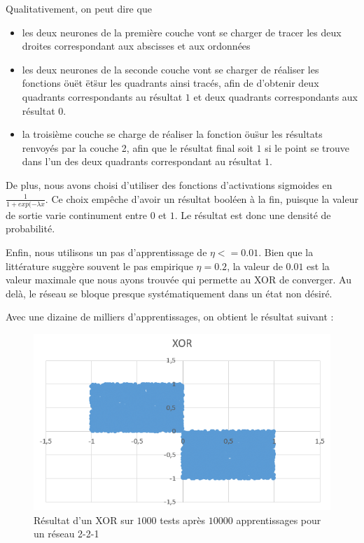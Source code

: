 Qualitativement, on peut dire que 
\begin{itemize}
  \item les deux neurones de la première couche vont se charger de tracer les deux droites correspondant aux abscisses et aux ordonnées
  \item les deux neurones de la seconde couche vont se charger de réaliser les fonctions \"ou\" et \"et\" sur les quadrants ainsi tracés, afin de d'obtenir deux quadrants correspondants au résultat $1$ et deux quadrants correspondants aux résultat $0$.
  \item la troisième couche se charge de réaliser la fonction \"ou\" sur les résultats renvoyés par la couche 2, afin que le résultat final soit $1$ si le point se trouve dans l'un des deux quadrants correspondant au résultat $1$.
\end{itemize}

De plus, nous avons choisi d'utiliser des fonctions d'activations sigmoides en $\frac{1}{1+exp(-\lambda x}$. Ce choix empêche d'avoir un résultat booléen à la fin, puisque la valeur de sortie varie continument entre $0$ et $1$. Le résultat est donc une densité de probabilité.

Enfin, nous utilisons un pas d'apprentissage de $\eta <= 0.01$. Bien que la littérature suggère souvent le pas empirique $\eta = 0.2$, la valeur de $0.01$ est la valeur maximale que nous ayons trouvée qui permette au XOR de converger. Au delà, le réseau se bloque presque systématiquement dans un état non désiré.

Avec une dizaine de milliers d'apprentissages, on obtient le résultat suivant : 

\begin{figure}[h!]
  \centering
  \includegraphics[scale=0.5]{images/resultat_xor.png}
  \caption{Résultat d'un XOR sur $1000$ tests après $10000$ apprentissages pour un réseau 2-2-1}
\end{figure}
